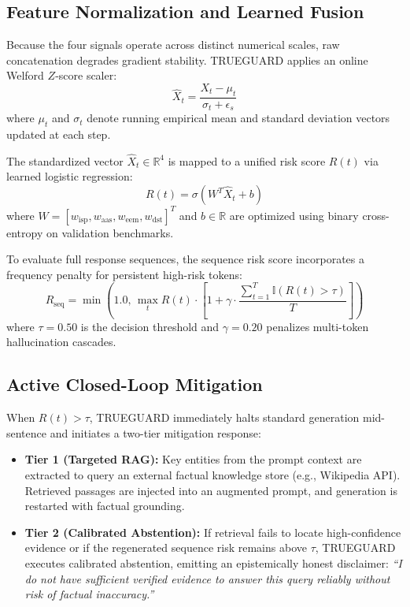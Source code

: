 \documentclass[journal]{IEEEtran}
\begin{document}
\subsection{Feature Normalization and Learned Fusion}
Because the four signals operate across distinct numerical scales, raw concatenation degrades gradient stability. TRUEGUARD applies an online Welford $Z$-score scaler:
\begin{equation}
    \hat{X}_t = \frac{X_t - \mu_t}{\sigma_t + \epsilon_s}
\end{equation}
where $\mu_t$ and $\sigma_t$ denote running empirical mean and standard deviation vectors updated at each step.

The standardized vector $\hat{X}_t \in \mathbb{R}^4$ is mapped to a unified risk score $R(t)$ via learned logistic regression:
\begin{equation}
    R(t) = \sigma(W^T \hat{X}_t + b)
\end{equation}
where $W = [w_{\text{isp}}, w_{\text{aas}}, w_{\text{eem}}, w_{\text{dst}}]^T$ and $b \in \mathbb{R}$ are optimized using binary cross-entropy on validation benchmarks.

To evaluate full response sequences, the sequence risk score incorporates a frequency penalty for persistent high-risk tokens:
\begin{equation}
    R_{\text{seq}} = \min\left(1.0, \, \max_t R(t) \cdot \left[1 + \gamma \cdot \frac{\sum_{t=1}^T \mathbb{I}(R(t) > \tau)}{T}\right]\right)
\label{eq:rseq}
\end{equation}
where $\tau = 0.50$ is the decision threshold and $\gamma = 0.20$ penalizes multi-token hallucination cascades.

\subsection{Active Closed-Loop Mitigation}
When $R(t) > \tau$, TRUEGUARD immediately halts standard generation mid-sentence and initiates a two-tier mitigation response:
\begin{itemize}
    \item \textbf{Tier 1 (Targeted RAG):} Key entities from the prompt context are extracted to query an external factual knowledge store (e.g., Wikipedia API). Retrieved passages are injected into an augmented prompt, and generation is restarted with factual grounding.
    \item \textbf{Tier 2 (Calibrated Abstention):} If retrieval fails to locate high-confidence evidence or if the regenerated sequence risk remains above $\tau$, TRUEGUARD executes calibrated abstention, emitting an epistemically honest disclaimer: \textit{``I do not have sufficient verified evidence to answer this query reliably without risk of factual inaccuracy.''}
\end{itemize}
\end{document}
